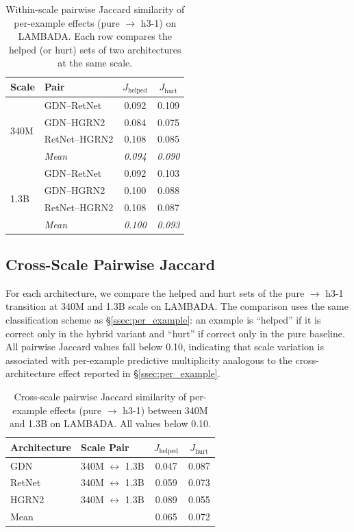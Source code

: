 \begin{table}[ht]
\centering
\small
\caption{Within-scale pairwise Jaccard similarity of per-example effects (pure $\to$ h3-1) on LAMBADA. Each row compares the helped (or hurt) sets of two architectures at the same scale.}
\label{tab:within_scale_jaccard}
\begin{tabular}{llcc}
\toprule
Scale & Pair & $J_{\text{helped}}$ & $J_{\text{hurt}}$ \\
\midrule
\multirow{4}{*}{340M} & GDN--RetNet & 0.092 & 0.109 \\
& GDN--HGRN2 & 0.084 & 0.075 \\
& RetNet--HGRN2 & 0.108 & 0.085 \\
& \textit{Mean} & \textit{0.094} & \textit{0.090} \\
\midrule
\multirow{4}{*}{1.3B} & GDN--RetNet & 0.092 & 0.103 \\
& GDN--HGRN2 & 0.100 & 0.088 \\
& RetNet--HGRN2 & 0.108 & 0.087 \\
& \textit{Mean} & \textit{0.100} & \textit{0.093} \\
\bottomrule
\end{tabular}
\end{table}

\subsection{Cross-Scale Pairwise Jaccard}

For each architecture, we compare the helped and hurt sets of the pure $\to$ h3-1 transition at 340M and 1.3B scale on LAMBADA.
The comparison uses the same classification scheme as \S\ref{ssec:per_example}: an example is ``helped'' if it is correct only in the hybrid variant and ``hurt'' if correct only in the pure baseline.
All pairwise Jaccard values fall below 0.10, indicating that scale variation is associated with per-example predictive multiplicity analogous to the cross-architecture effect reported in \S\ref{ssec:per_example}.

\begin{table}[ht]
\centering
\caption{Cross-scale pairwise Jaccard similarity of per-example effects (pure $\to$ h3-1) between 340M and 1.3B on LAMBADA. All values below 0.10.}
\label{tab:cross_scale_jaccard}
\begin{tabular}{llcc}
\toprule
Architecture & Scale Pair & $J_{\text{helped}}$ & $J_{\text{hurt}}$ \\
\midrule
GDN & 340M $\leftrightarrow$ 1.3B & 0.047 & 0.087 \\
RetNet & 340M $\leftrightarrow$ 1.3B & 0.059 & 0.073 \\
HGRN2 & 340M $\leftrightarrow$ 1.3B & 0.089 & 0.055 \\
\midrule
Mean & & 0.065 & 0.072 \\
\bottomrule
\end{tabular}
\end{table}

